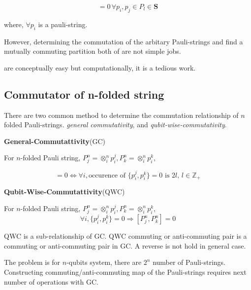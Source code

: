 \begin{equation}
    [p_i, p_j] =0 \, \forall p_i, p_j \in P_l \in \mathbf{S}
\end{equation}

where, $\forall p_i$ is a pauli-string. 

However, determining the commutation of the arbitary Pauli-strings 
and find a mutually commuting partition both of are not simple jobs.

are conceptually easy but computationally, it is a tedious work.

\subsection{Commutator of n-folded string}

There are two common method to determine the commutation relationship of $n$ folded Pauli-strings.
\textit{general commutativity}, and \textit{qubit-wise-commutativity}\cite{gokhale_on3_2020}. %

\begin{theorem}\textbf{General-Commutattivity}(GC)

    For $n$-folded Pauli string, $P_j^n = \otimes_i^n p_i^j, P_k^n = \otimes_i^n p_i^k$,
    
    \begin{equation}
        [P_j^n, P_k^n] = 0 \Leftrightarrow \forall i, \mbox{occurence of } \{p_i^j, p_i^k\} = 0 \mbox{ is } 2l,\, l \in \mathbb{Z}_+ 
    \end{equation}
\end{theorem}

\begin{theorem}\textbf{Qubit-Wise-Commutattivity}(QWC)

    For $n$-folded Pauli string, $P_j^n = \otimes_i^n p_i^j, P_k^n = \otimes_i^n p_i^k$,
    \begin{equation}
        \forall i, \{p_i^j, p_i^k\} = 0 \Rightarrow [P_j^n, P_k^n] = 0
    \end{equation}
\end{theorem}

QWC is a sub-relationship of GC. QWC commuting or anti-commuting pair is a commuting or anti-commuting pair in GC.
A reverse is not hold in general case.


The problem is for $n$-qubits system, there are $2^n$ number of Pauli-strings.
Constructing commuting/anti-commuting map of the Pauli-strings requires next number of operations with GC.

